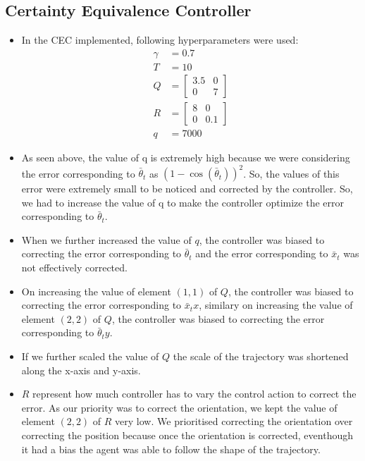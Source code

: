 \documentclass[conference]{IEEEtran}
\begin{document}
\subsection{Certainty Equivalence Controller}
\begin{itemize}
    \item In the CEC implemented, following hyperparameters were used:
    \begin{align*}
        \gamma &= 0.7 \\
        T &= 10 \\
        Q &= \begin{bmatrix}
            3.5 & 0  \\
            0 & 7 
        \end{bmatrix} \\
        R &= \begin{bmatrix}
            8 & 0  \\
            0 & 0.1
        \end{bmatrix} \\
        q &= 7000
    \end{align*}
    \item As seen above, the value of q is extremely high because we were considering the error corresponding to $\bar{\theta}_t$ as $(1 - \cos(\bar{\theta}_t))^2$. So, the 
    values of this error were extremely small to be noticed and corrected by the controller. So, we had to increase the value of q to make the controller optimize the error corresponding to $\bar{\theta}_t$.
    \item When we further increased the value of $q$, the controller was biased to correcting the error corresponding to $\bar{\theta}_t$ and the error corresponding to $\bar{x}_t$ was not effectively corrected.
    \item On increasing the value of element $(1, 1)$ of $Q$, the controller was biased to correcting the error corresponding to $\bar{x}_tx$, similary on increasing the value of element $(2, 2)$ of $Q$, the controller was biased to correcting the error corresponding to $\bar{\theta}_ty$.
    \item If we further scaled the value of $Q$ the scale of the trajectory was shortened along the x-axis and y-axis.
    \item $R$ represent how much controller has to vary the control action to correct the error. As our priority was to correct the orientation, we kept the value of element $(2, 2)$ of $R$ very low. We prioritised 
    correcting the orientation over correcting the position because once the orientation is corrected, eventhough it had a bias the agent was able to follow the shape of the trajectory.

\end{itemize}
\end{document}
